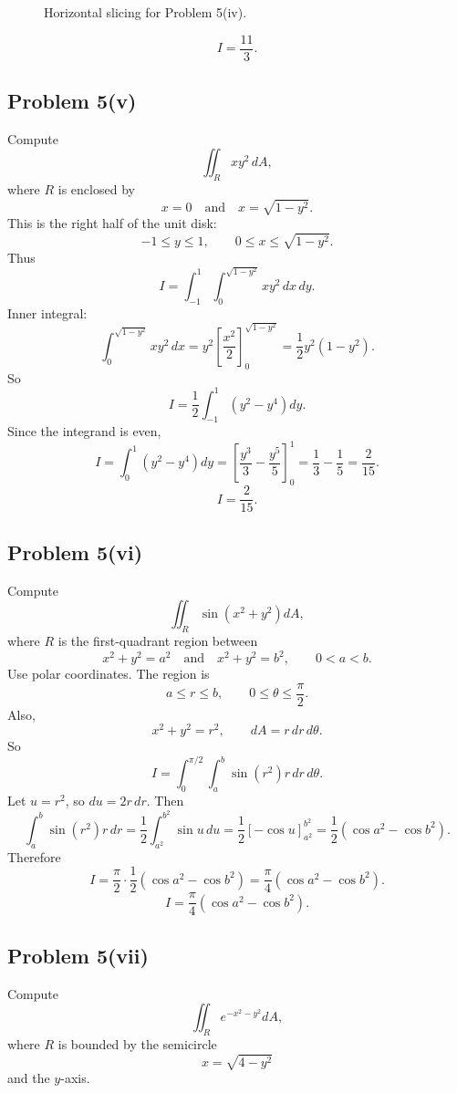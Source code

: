 \documentclass[11pt,a4paper]{article}
\begin{document}
\begin{figure}[H]
\centering
{}
\caption{Horizontal slicing for Problem 5(iv).}
\end{figure}

\[
\boxed{I=\frac{11}{3}.}
\]

\subsection{Problem 5(v)}
Compute
\[
 \iint_R xy^2\,dA,
\]
where \(R\) is enclosed by
\[
 x=0
\quad\text{and}\quad
x=\sqrt{1-y^2}.
\]
This is the right half of the unit disk:
\[
 -1\le y\le1,
\qquad 0\le x\le\sqrt{1-y^2}.
\]
Thus
\[
 I=\int_{-1}^{1}\int_0^{\sqrt{1-y^2}}xy^2\,dx\,dy.
\]
Inner integral:
\[
 \int_0^{\sqrt{1-y^2}}xy^2\,dx
 =y^2\left[\frac{x^2}{2}\right]_0^{\sqrt{1-y^2}}
 =\frac12y^2(1-y^2).
\]
So
\[
 I=\frac12\int_{-1}^{1}(y^2-y^4)dy.
\]
Since the integrand is even,
\[
 I=\int_0^1(y^2-y^4)dy
 =\left[\frac{y^3}{3}-\frac{y^5}{5}\right]_0^1
 =\frac13-\frac15=\frac{2}{15}.
\]
\[
\boxed{I=\frac{2}{15}.}
\]

\subsection{Problem 5(vi)}
Compute
\[
 \iint_R\sin(x^2+y^2)dA,
\]
where \(R\) is the first-quadrant region between
\[
 x^2+y^2=a^2
\quad\text{and}\quad
x^2+y^2=b^2,
\qquad 0<a<b.
\]
Use polar coordinates.  The region is
\[
 a\le r\le b,
\qquad 0\le\theta\le\frac\pi2.
\]
Also,
\[
 x^2+y^2=r^2,
\qquad dA=r\,dr\,d\theta.
\]
So
\[
 I=\int_0^{\pi/2}\int_a^b\sin(r^2)r\,dr\,d\theta.
\]
Let \(u=r^2\), so \(du=2r\,dr\). Then
\[
 \int_a^b\sin(r^2)r\,dr
 =\frac12\int_{a^2}^{b^2}\sin u\,du
 =\frac12[-\cos u]_{a^2}^{b^2}
 =\frac12(\cos a^2-\cos b^2).
\]
Therefore
\[
 I=\frac\pi2\cdot\frac12(\cos a^2-\cos b^2)
 =\frac\pi4(\cos a^2-\cos b^2).
\]
\[
\boxed{I=\frac\pi4(\cos a^2-\cos b^2).}
\]

\subsection{Problem 5(vii)}
Compute
\[
 \iint_R e^{-x^2-y^2}dA,
\]
where \(R\) is bounded by the semicircle
\[
 x=\sqrt{4-y^2}
\]
and the \(y\)-axis.
\end{document}
